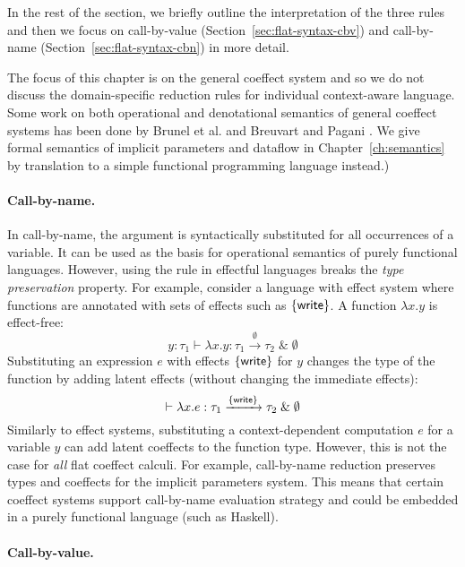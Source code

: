 In the rest of the section, we briefly outline the interpretation of the three
rules and then we focus on call-by-value (Section~\ref{sec:flat-syntax-cbv}) and call-by-name
(Section~\ref{sec:flat-syntax-cbn}) in more detail.

The focus of this chapter is on the general coeffect system and so we do not discuss the
domain-specific reduction rules for individual context-aware language. Some work on both operational
and denotational semantics of general coeffect systems has been done by Brunel et al.
\cite{coeffects-quantitative} and Breuvart and Pagani \cite{coeffects-modelling}.
We give formal semantics of implicit parameters and dataflow in Chapter~\ref{ch:semantics} by
translation to a simple functional programming language instead.)

\paragraph{Call-by-name.}
In call-by-name, the argument is syntactically substituted for all occurrences of a variable. It
can be used as the basis for operational semantics of purely functional languages. However, using
the rule in effectful languages breaks the \emph{type preservation} property. For example, consider
a language with effect system where functions are annotated with sets of effects such as $\{ \textnormal{\sffamily write} \}$.
A function $\lambda x.y$ is effect-free:
%
\begin{equation*}
y\!:\!\tau_1 \vdash \lambda x.y : \tau_1 \xrightarrow{\emptyset} \tau_2 \;\&\; \emptyset
\end{equation*}
%
Substituting an expression $e$ with effects $\{ \textnormal{\sffamily write} \}$ for $y$ changes the type of
the function by adding latent effects (without changing the immediate effects):
%
\begin{equation*}
\vdash \lambda x.e : \tau_1 \xrightarrow{ \{ \textnormal{\sffamily write} \} } \tau_2 \;\&\; \emptyset
\end{equation*}
%
Similarly to effect systems, substituting a context-dependent computation $e$ for a variable $y$ can
add latent coeffects to the function type. However, this is not the case for \emph{all} flat coeffect
calculi. For example, call-by-name reduction preserves types and coeffects for the implicit
parameters system. This means that certain coeffect systems support call-by-name evaluation strategy
and could be embedded in a purely functional language (such as Haskell).

\paragraph{Call-by-value.}


